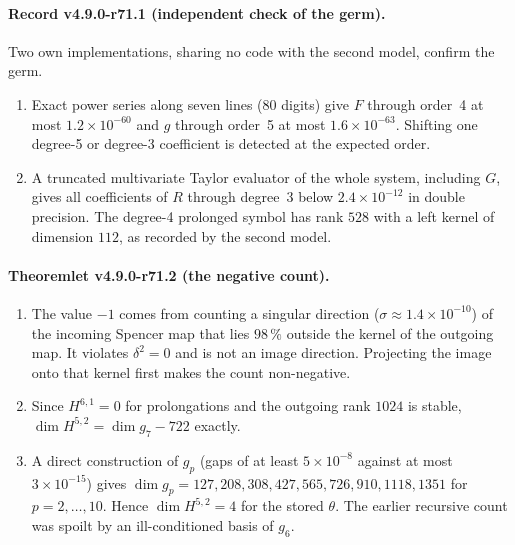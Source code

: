 \paragraph{Record v4.9.0-r71.1 (independent check of the germ).}
Two own implementations, sharing no code with the second model, confirm the germ.
\begin{enumerate}[leftmargin=2em]
\item[(a)] Exact power series along seven lines (80 digits) give \(F\) through order~4 at most \(1.2\times10^{-60}\) and \(g\)
through order~5 at most \(1.6\times10^{-63}\).  Shifting one degree-5 or degree-3 coefficient is detected at the expected order.
\item[(b)] A truncated multivariate Taylor evaluator of the whole system, including \(G\), gives all coefficients of \(R\)
through degree~3 below \(2.4\times10^{-12}\) in double precision.  The degree-4 prolonged symbol has rank \(528\) with a left
kernel of dimension \(112\), as recorded by the second model.
\end{enumerate}

\paragraph{Theoremlet v4.9.0-r71.2 (the negative count).}
\begin{enumerate}[leftmargin=2em]
\item[(a)] The value \(-1\) comes from counting a singular direction (\(\sigma\approx1.4\times10^{-10}\)) of the incoming Spencer map
that lies \(98\,\%\) outside the kernel of the outgoing map.  It violates \(\delta^2=0\) and is not an image direction.
Projecting the image onto that kernel first makes the count non-negative.
\item[(b)] Since \(H^{6,1}=0\) for prolongations and the outgoing rank \(1024\) is stable,
\(\dim H^{5,2}=\dim g_7-722\) exactly.
\item[(c)] A direct construction of \(g_p\) (gaps of at least \(5\times10^{-8}\) against at most \(3\times10^{-15}\)) gives
\(\dim g_p=127,208,308,427,565,726,910,1118,1351\) for \(p=2,\dots,10\).  Hence \(\dim H^{5,2}=4\) for the stored \(\theta\).
The earlier recursive count was spoilt by an ill-conditioned basis of \(g_6\).
\end{enumerate}

